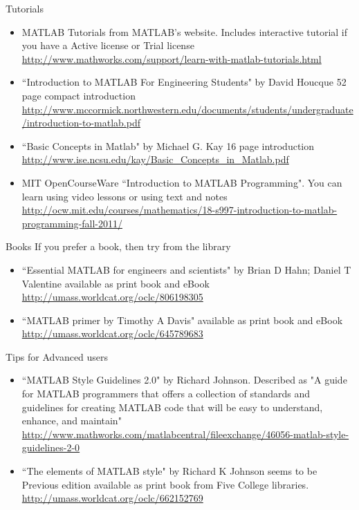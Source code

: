 \documentclass[10pt]{beamer}
\begin{document}
\begin{frame}{Tutorials}
\begin{itemize}
\item MATLAB Tutorials from MATLAB's website. Includes interactive tutorial if you have a Active license or Trial license  \url{http://www.mathworks.com/support/learn-with-matlab-tutorials.html}
\item ``Introduction to MATLAB For Engineering Students" by David Houcque 52 page compact introduction\\
 \url{http://www.mccormick.northwestern.edu/documents/students/undergraduate/introduction-to-matlab.pdf}
 \item ``Basic Concepts in Matlab" by Michael G. Kay 16 page introduction\\
 \url{http://www.ise.ncsu.edu/kay/Basic_Concepts_in_Matlab.pdf}
\item MIT OpenCourseWare ``Introduction to MATLAB Programming". You can learn using video lessons or using text and notes \url{http://ocw.mit.edu/courses/mathematics/18-s997-introduction-to-matlab-programming-fall-2011/}
\end{itemize}
\end{frame}
\begin{frame}{Books}
If you prefer a book, then try from the library
\begin{itemize}
\item ``Essential MATLAB for engineers and scientists" by Brian D Hahn; Daniel T Valentine available as print book and eBook \\
\url{http://umass.worldcat.org/oclc/806198305}

\item ``MATLAB primer by Timothy A Davis" available as print book and eBook \\ 
\url{http://umass.worldcat.org/oclc/645789683}

\end{itemize}
\end{frame}
\begin{frame}{Tips for Advanced users}
\begin{itemize}
\item ``MATLAB Style Guidelines 2.0" by Richard Johnson. Described as "A guide for MATLAB programmers that offers a collection of standards and guidelines for creating MATLAB code that will be easy to understand, enhance, and maintain"\\
  \url{http://www.mathworks.com/matlabcentral/fileexchange/46056-matlab-style-guidelines-2-0}
\item ``The elements of MATLAB style" by 	Richard K Johnson seems to be Previous edition available as print book from Five College libraries. \url {http://umass.worldcat.org/oclc/662152769}

\end{itemize}
\end{frame}
\end{document}
